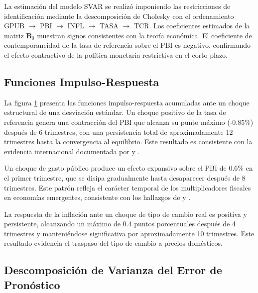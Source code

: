 \documentclass[12pt,a4paper]{article}
\begin{document}
La estimación del modelo SVAR se realizó imponiendo las restricciones de identificación mediante la descomposición de Cholesky con el ordenamiento GPUB $\to$ PBI $\to$ INFL $\to$ TASA $\to$ TCR. Los coeficientes estimados de la matriz $\mathbf{B}_0$ muestran signos consistentes con la teoría económica. El coeficiente de contemporaneidad de la tasa de referencia sobre el PBI es negativo, confirmando el efecto contractivo de la política monetaria restrictiva en el corto plazo.

\subsection{Funciones Impulso-Respuesta}

La figura \ref{fig:irf} presenta las funciones impulso-respuesta acumuladas ante un choque estructural de una desviación estándar. Un choque positivo de la tasa de referencia genera una contracción del PBI que alcanza su punto máximo (-0.85\%) después de 6 trimestres, con una persistencia total de aproximadamente 12 trimestres hasta la convergencia al equilibrio. Este resultado es consistente con la evidencia internacional documentada por \citet{christiano1999} y \citet{bernanke1992}.

Un choque de gasto público produce un efecto expansivo sobre el PBI de 0.6\% en el primer trimestre, que se disipa gradualmente hasta desaparecer después de 8 trimestres. Este patrón refleja el carácter temporal de los multiplicadores fiscales en economías emergentes, consistente con los hallazgos de \citet{perotti2004} y \citet{favero2005}.

La respuesta de la inflación ante un choque de tipo de cambio real es positiva y persistente, alcanzando un máximo de 0.4 puntos porcentuales después de 4 trimestres y manteniéndose significativa por aproximadamente 10 trimestres. Este resultado evidencia el traspaso del tipo de cambio a precios domésticos.

\begin{figure}[H]
\centering
{}
\label{fig:irf}
\end{figure}

\subsection{Descomposición de Varianza del Error de Pronóstico}
\end{document}
